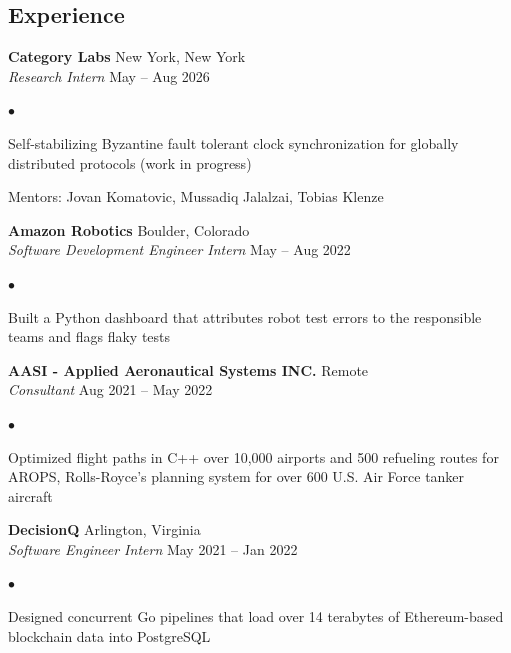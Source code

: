 \documentclass[margin,line]{res}
\newenvironment{list2}{
  \begin{list}{$\bullet$}{%
      \setlength{\itemsep}{0in}
      \setlength{\parsep}{0in} \setlength{\parskip}{0in}
      \setlength{\topsep}{0in} \setlength{\partopsep}{0in} 
      \setlength{\leftmargin}{0.2in}}}{\end{list}}
\begin{document}
\begin{resume}
  \section{\sc Experience}
   {\bf Category Labs} \hfill New York, New York \\
  {\em Research Intern} \hfill May -- Aug 2026

  \begin{list2}
    \item Self-stabilizing Byzantine fault tolerant clock synchronization for globally distributed protocols (work in progress)
    \item Mentors: Jovan Komatovic, Mussadiq Jalalzai, Tobias Klenze
  \end{list2}

   {\bf Amazon Robotics} \hfill Boulder, Colorado \\
  {\em Software Development Engineer Intern} \hfill May -- Aug 2022

  \begin{list2}
    \item Built a Python dashboard that attributes robot test errors to the responsible teams and flags flaky tests
  \end{list2}

  {\bf AASI - Applied Aeronautical Systems INC.} \hfill Remote \\
  {\em Consultant} \hfill Aug 2021 -- May 2022

  \begin{list2}
    \item Optimized flight paths in C++ over 10,000 airports and 500 refueling routes for AROPS, Rolls-Royce's planning system for over 600 U.S. Air Force tanker aircraft
  \end{list2}


  {\bf DecisionQ} \hfill Arlington, Virginia \\
  {\em Software Engineer Intern} \hfill May 2021 -- Jan 2022

  \begin{list2}
    \item Designed concurrent Go pipelines that load over 14 terabytes of Ethereum-based blockchain data into PostgreSQL
  \end{list2}




\end{resume}
\end{document}
